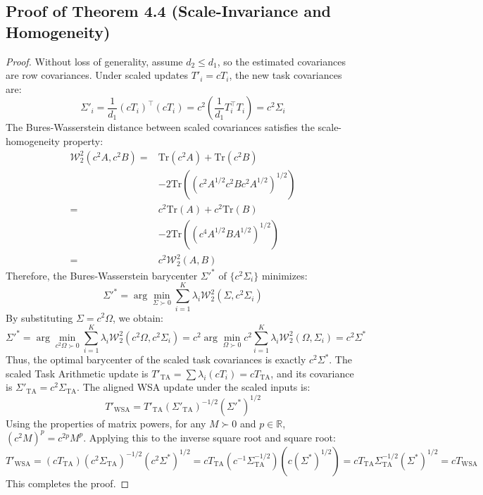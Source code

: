 \documentclass{article}
\theoremstyle{plain}
\theoremstyle{definition}
\theoremstyle{remark}
\begin{document}
\subsection{Proof of Theorem 4.4 (Scale-Invariance and Homogeneity)}
\label{appendix:proof-homogeneity}
\begin{proof}
Without loss of generality, assume $d_2 \leq d_1$, so the estimated covariances are row covariances. Under scaled updates $T'_i = c T_i$, the new task covariances are:
\begin{equation}
  \Sigma'_i = \frac{1}{d_1} (c T_i)^\top (c T_i) = c^2 \left( \frac{1}{d_1} T_i^\top T_i \right) = c^2 \Sigma_i
\end{equation}
The Bures-Wasserstein distance between scaled covariances satisfies the scale-homogeneity property:
\begin{equation}
  \begin{split}
    \mathcal{W}_2^2(c^2 A, c^2 B) = {} & \text{Tr}(c^2 A) + \text{Tr}(c^2 B) \\
    & - 2 \text{Tr} \left( (c^2 A^{1/2} c^2 B c^2 A^{1/2})^{1/2} \right) \\
    = {} & c^2 \text{Tr}(A) + c^2 \text{Tr}(B) \\
    & - 2 \text{Tr} \left( (c^4 A^{1/2} B A^{1/2})^{1/2} \right) \\
    = {} & c^2 \mathcal{W}_2^2(A, B)
  \end{split}
\end{equation}
Therefore, the Bures-Wasserstein barycenter $\Sigma'^*$ of $\{c^2 \Sigma_i\}$ minimizes:
\begin{equation}
  \Sigma'^* = \arg\min_{\Sigma \succ 0} \sum_{i=1}^K \lambda_i \mathcal{W}_2^2(\Sigma, c^2 \Sigma_i)
\end{equation}
By substituting $\Sigma = c^2 \Omega$, we obtain:
\begin{equation}
  \Sigma'^* = \arg\min_{c^2 \Omega \succ 0} \sum_{i=1}^K \lambda_i \mathcal{W}_2^2(c^2 \Omega, c^2 \Sigma_i) = c^2 \arg\min_{\Omega \succ 0} c^2 \sum_{i=1}^K \lambda_i \mathcal{W}_2^2(\Omega, \Sigma_i) = c^2 \Sigma^*
\end{equation}
Thus, the optimal barycenter of the scaled task covariances is exactly $c^2 \Sigma^*$.
The scaled Task Arithmetic update is $T'_{\text{TA}} = \sum \lambda_i (c T_i) = c T_{\text{TA}}$, and its covariance is $\Sigma'_{\text{TA}} = c^2 \Sigma_{\text{TA}}$.
The aligned WSA update under the scaled inputs is:
\begin{equation}
  T'_{\text{WSA}} = T'_{\text{TA}} (\Sigma'_{\text{TA}})^{-1/2} (\Sigma'^*)^{1/2}
\end{equation}
Using the properties of matrix powers, for any $M \succ 0$ and $p \in \mathbb{R}$, $(c^2 M)^p = c^{2p} M^p$. Applying this to the inverse square root and square root:
\begin{equation}
  T'_{\text{WSA}} = (c T_{\text{TA}}) (c^2 \Sigma_{\text{TA}})^{-1/2} (c^2 \Sigma^*)^{1/2} = c T_{\text{TA}} \left( c^{-1} \Sigma_{\text{TA}}^{-1/2} \right) \left( c (\Sigma^*)^{1/2} \right) = c T_{\text{TA}} \Sigma_{\text{TA}}^{-1/2} (\Sigma^*)^{1/2} = c T_{\text{WSA}}
\end{equation}
This completes the proof.
\end{proof}
\end{document}
